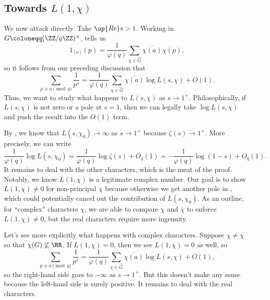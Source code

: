 \documentclass[../notes.tex]{subfiles}
\begin{document}
\subsection{Towards \texorpdfstring{$L(1,\chi)$}{ L(1,chi)}}
We now attack  directly. Take $\op{Re}s>1$. Working in $G\coloneqq(\ZZ/q\ZZ)^\times$,  tells us
\[1_{[a]}(p)=\frac1{\varphi(q)}\sum_{\chi\in\widehat G}\overline{\chi(a)}\chi(p),\]
so it follows from our preceding discussion that
\begin{equation}
	\sum_{p\equiv a\pmod q}\frac1{p^s}=\frac1{\varphi(q)}\sum_{\chi\in\widehat G}\overline{\chi(a)}\log L(s,\chi)+O(1). \label{eq:reduce-to-l}
\end{equation}
Thus, we want to study what happens to $L(s,\chi)$ as $s\to1^+$. Philosophically, if $L(s,\chi)$ is not zero or a pole at $s=1$, then we can legally take $\log L(s,\chi)$ and push the result into the $O(1)$ term.

By , we know that $L(s,\chi_0)\to\infty$ as $s\to1^+$ because $\zeta(s)\to1^+$. More precisely, we can write
\[\frac1{\varphi(q)}\log L(s,\chi_0)=\frac1{\varphi(q)}\log\zeta(s)+O_q(1)=-\frac1{\varphi(q)}\log(1-s)+O_q(1).\]
It remains to deal with the other characters, which is the meat of the proof. Notably, we know $L(1,\chi)$ is a legitimate complex number. Our goal is to show $L(1,\chi)\ne0$ for non-principal $\chi$ because otherwise we get another pole in , which could potentially cancel out the contribution of $L(s,\chi_0)$. As an outline, for ``complex'' characters $\chi$, we are able to compare $\chi$ and $\overline\chi$ to enforce $L(1,\chi)\ne0$, but the real characters require more ingenuity.

Let's see more explicitly what happens with complex characters. Suppose $\chi\ne\overline\chi$ so that $\chi(G)\not\subseteq\RR$. If $L(1,\chi)=0$, then we see $L(1,\overline\chi)=0$ as well, so
\[\sum_{p\equiv a\pmod q}\frac1{p^s}=\frac1{\varphi(q)}\sum_{\chi\in\widehat G}\overline{\chi(a)}\log L(s,\chi)+O(1),\]
so the right-hand side goes to $-\infty$ as $s\to1^+$. But this doesn't make any sense because the left-hand side is surely positive. It remains to deal with the real characters.
\end{document}

